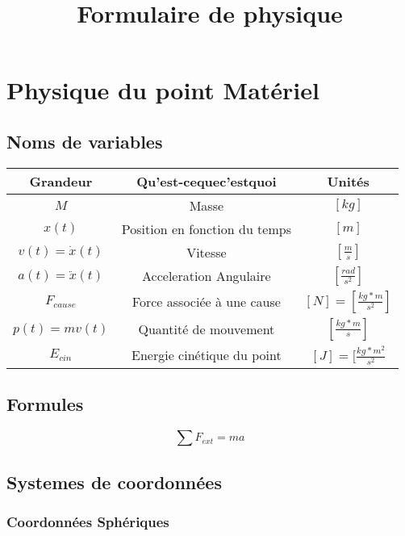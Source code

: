\documentclass[10pt,a4paper]{article}
\title{Formulaire de physique}
\begin{document}
\section{Physique du point Matériel}

\subsection{Noms de variables}

\begin{tabular}{|c|c|c|}
\hline 
Grandeur & Qu'est-cequec'estquoi & Unités \\ 
\hline 
$M$ & Masse & $[kg]$ \\
\hline
$x(t)$ & Position en fonction du temps & $[m]$ \\ 
\hline
$v(t) = \dot{x}(t)$ & Vitesse & $[\frac{m}{s}]$ \\
\hline
$a(t) = \ddot{x}(t)$ & Acceleration Angulaire & $[\frac{rad}{s^2}]$ \\
\hline
$F_{cause}$ & Force associée à une cause & $[N] = [\frac{kg*m}{s^2}]$ \\
\hline
$p(t) = mv(t)$ & Quantité de mouvement & $[\frac{kg*m}{s}]$ \\
\hline
$E_{cin}$ & Energie cinétique du point & $[J] = [\frac{kg*m^2}{s^2}$ \\
\hline
\end{tabular}

\subsection{Formules}

$$\sum F_{ext} = ma$$

\subsection{Systemes de coordonnées}
\subsubsection{Coordonnées Sphériques}
\end{document}
